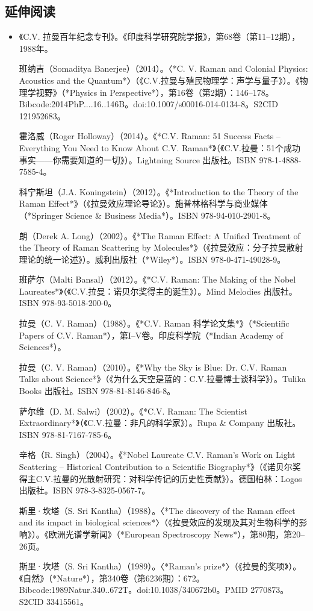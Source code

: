 \subsection{延伸阅读}
\begin{itemize}
\item 《C.V. 拉曼百年纪念专刊》。《印度科学研究院学报》，第68卷（第11–12期），1988年。

班纳吉（Somaditya Banerjee）（2014）。〈*C. V. Raman and Colonial Physics: Acoustics and the Quantum*〉（《C.V.拉曼与殖民物理学：声学与量子》）。《物理学视野》（*Physics in Perspective*），第16卷（第2期）：146–178。Bibcode:2014PhP....16..146B。doi:10.1007/s00016-014-0134-8。S2CID 121952683。

霍洛威（Roger Holloway）（2014）。《*C.V. Raman: 51 Success Facts – Everything You Need to Know About C.V. Raman*》（《C.V.拉曼：51个成功事实——你需要知道的一切》）。Lightning Source 出版社。ISBN 978-1-4888-7585-4。

科宁斯坦（J.A. Koningstein）（2012）。《*Introduction to the Theory of the Raman Effect*》（《拉曼效应理论导论》）。施普林格科学与商业媒体（*Springer Science & Business Media*）。ISBN 978-94-010-2901-8。

朗（Derek A. Long）（2002）。《*The Raman Effect: A Unified Treatment of the Theory of Raman Scattering by Molecules*》（《拉曼效应：分子拉曼散射理论的统一论述》）。威利出版社（*Wiley*）。ISBN 978-0-471-49028-9。

班萨尔（Malti Bansal）（2012）。《*C.V. Raman: The Making of the Nobel Laureates*》（《C.V.拉曼：诺贝尔奖得主的诞生》）。Mind Melodies 出版社。ISBN 978-93-5018-200-0。

拉曼（C. V. Raman）（1988）。《*C.V. Raman 科学论文集*》（*Scientific Papers of C.V. Raman*），第I–V卷。印度科学院（*Indian Academy of Sciences*）。

拉曼（C. V. Raman）（2010）。《*Why the Sky is Blue: Dr. C.V. Raman Talks about Science*》（《为什么天空是蓝的：C.V.拉曼博士谈科学》）。Tulika Books 出版社。ISBN 978-81-8146-846-8。

萨尔维（D. M. Salwi）（2002）。《*C.V. Raman: The Scientist Extraordinary*》（《C.V.拉曼：非凡的科学家》）。Rupa & Company 出版社。ISBN 978-81-7167-785-6。

辛格（R. Singh）（2004）。《*Nobel Laureate C.V. Raman's Work on Light Scattering – Historical Contribution to a Scientific Biography*》（《诺贝尔奖得主C.V.拉曼的光散射研究：对科学传记的历史性贡献》）。德国柏林：Logos 出版社。ISBN 978-3-8325-0567-7。

斯里·坎塔（S. Sri Kantha）（1988）。〈*The discovery of the Raman effect and its impact in biological sciences*〉（《拉曼效应的发现及其对生物科学的影响》）。《欧洲光谱学新闻》（*European Spectroscopy News*），第80期，第20–26页。

斯里·坎塔（S. Sri Kantha）（1989）。〈*Raman's prize*〉（《拉曼的奖项》）。《自然》（*Nature*），第340卷（第6236期）：672。Bibcode:1989Natur.340..672T。doi:10.1038/340672b0。PMID 2770873。S2CID 33415561。

\end{itemize}